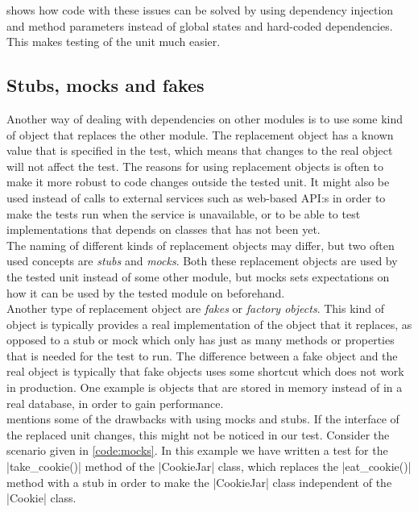 \citeauthor{video:misko_psychology} shows how code with these issues can
be solved by using dependency injection and method parameters instead
of global states and hard-coded dependencies. This makes testing of the
unit much easier.\\


\subsection{Stubs, mocks and fakes}

Another way of dealing with dependencies on other modules is to use some
kind of object that replaces the other module. The replacement object
has a known value that is specified in the test, which means that
changes to the real object will not affect the test. The reasons for
using replacement objects is often to make it more robust to code
changes outside the tested unit. It might also be used instead of calls
to external services such as web-based API:s in order to make the tests
run when the service is unavailable, or to be able to test
implementations that depends on classes that has not been yet.\\

The naming of different kinds of replacement objects may differ, but two
often used concepts are \emph{stubs} and \emph{mocks}. Both these
replacement objects are used by the tested unit instead of some other
module, but mocks sets expectations on how it can be used by the tested
module on beforehand. \cite{web:mocks_arent_stubs}\\

Another type of replacement object are \emph{fakes} or \emph{factory
objects}. This kind of object is typically provides a real
implementation of the object that it replaces, as opposed to a stub or
mock which only has just as many methods or properties that is needed
for the test to run. The difference between a fake object and the real
object is typically that fake objects uses some shortcut which does not
work in production. One example is objects that are stored in memory
instead of in a real database, in order to gain performance.
\cite{web:mocks_arent_stubs}\\

\citet{video:boundaries} mentions some of the drawbacks with using mocks
and stubs. If the interface of the replaced unit changes, this might not
be noticed in our test. Consider the scenario given in \ref{code:mocks}.
In this example we have written a test for the |take_cookie()| method of
the |CookieJar| class, which replaces the |eat_cookie()| method with a
stub in order to make the |CookieJar| class independent of the |Cookie|
class.\\

